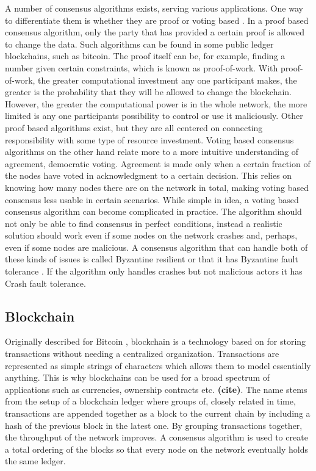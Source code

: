 \documentclass[english, biblatex, digitaloutput]{kththesis}
\begin{document}
A number of consensus algorithms exists, serving various applications. One way to differentiate them is whether they are proof or voting based \cite{nguyen_survey_2018}. In a proof based consensus algorithm, only the party that has provided a certain proof is allowed to change the data. Such algorithms can be found in some public ledger blockchains, such as bitcoin. The proof itself can be, for example, finding a number given certain constraints, which is known as proof-of-work. With proof-of-work, the greater computational investment any one participant makes, the greater is the probability that they will be allowed to change the blockchain. However, the greater the computational power is in the whole network, the more limited is any one participants possibility to control or use it maliciously. Other proof based algorithms exist, but they are all centered on connecting responsibility with some type of resource investment. Voting based consensus algorithms on the other hand relate more to a more intuitive understanding of agreement, \ie democratic voting. Agreement is made only when a certain fraction of the nodes have voted in acknowledgment to a certain decision. This relies on knowing how many nodes there are on the network in total, making voting based consensus less usable in certain scenarios. While simple in idea, a voting based consensus algorithm can become complicated in practice. The algorithm should not only be able to find consensus in perfect conditions, instead a realistic solution should work even if some nodes on the network crashes and, perhaps, even if some nodes are malicious. A consensus algorithm that can handle both of these kinds of issues is called Byzantine resilient \cite{goos_consensus_1983} or that it has Byzantine fault tolerance \cite{nguyen_survey_2018}. If the algorithm only handles crashes but not malicious actors it has Crash fault tolerance.


\subsection{Blockchain}

Originally described for Bitcoin \cite{nakamoto_bitcoin_nodate, di_pierro_what_2017}, blockchain is a technology based on  for storing transactions without needing a centralized organization. Transactions are represented as simple strings of characters which allows them to model essentially anything. This is why blockchains can be used for a broad spectrum of applications such as currencies, ownership contracts etc. \textbf{(cite)}. The name stems from the setup of a blockchain ledger where groups of, closely related in time, transactions are appended together as a block to the current chain by including a hash of the previous block in the latest one. By grouping transactions together, the throughput of the network improves. A consensus algorithm is used to create a total ordering of the blocks so that every node on the network eventually holds the same ledger.
\end{document}

